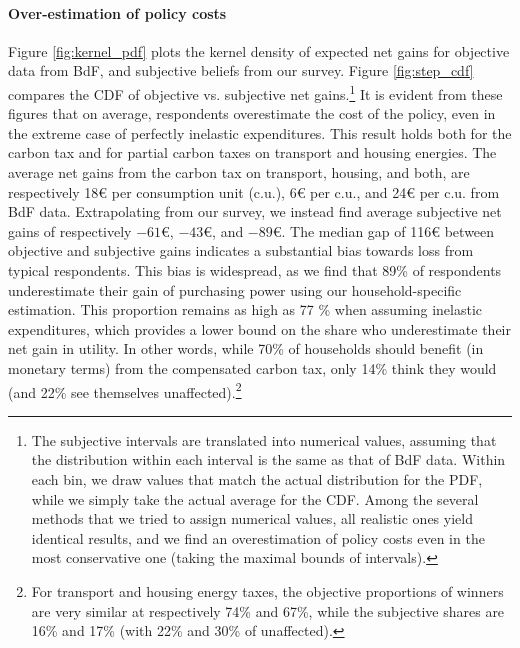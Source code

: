 \documentclass[11pt]{article}
\begin{document}
\paragraph{Over-estimation of policy costs}
Figure \ref{fig:kernel_pdf} plots the kernel density of expected net gains for objective data from BdF, and subjective beliefs from our survey. Figure \ref{fig:step_cdf} compares the CDF of objective vs. subjective net gains.\footnote{The subjective intervals are translated into numerical values, assuming that the distribution within each interval is the same as that of BdF data. Within each bin, we draw values that match the actual distribution for the PDF, while we simply take the actual average for the CDF. Among the several methods that we tried to assign numerical values, all realistic ones yield identical results, and we find an overestimation of policy costs even in the most conservative one (taking the maximal bounds of intervals).} It is evident from these figures that on average, respondents overestimate the cost of the policy, even in the extreme case of perfectly inelastic expenditures. This result holds both for the carbon tax and for partial carbon taxes on transport and housing energies. The average net gains from the carbon tax on transport, housing, and both, are respectively 18\euro{} per consumption unit (c.u.), 6\euro{} per c.u., and 24\euro{} per c.u. from BdF data. Extrapolating from our survey, we instead find average subjective net gains of respectively $-61$\euro{}, $-43$\euro{}, and $-89$\euro{}. The median gap of 116\euro{} between objective and subjective gains indicates a substantial bias towards loss from typical respondents. This bias is widespread, as we find that 89\% of respondents underestimate their gain of purchasing power using our household-specific estimation. This proportion remains as high as 77 \% when assuming inelastic expenditures, which provides a lower bound on the share who underestimate their net gain in utility. In other words, while 70\% of households should benefit (in monetary terms) from the compensated carbon tax, only 14\% think they would (and 22\% see themselves unaffected).\footnote{For transport and housing energy taxes, the objective proportions of winners are very similar at respectively 74\% and 67\%, while the subjective shares are 16\% and 17\% (with 22\% and 30\% of unaffected).}

\end{document}
